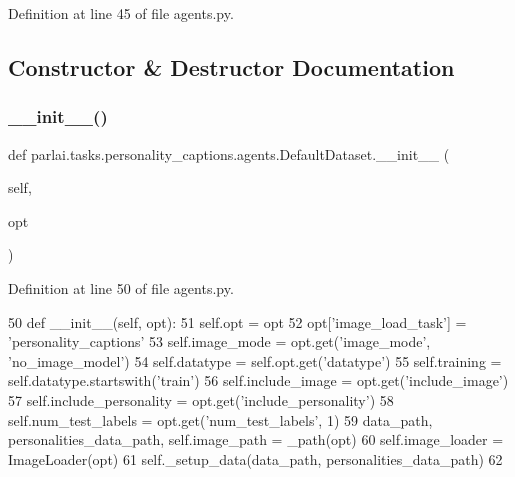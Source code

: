 Definition at line 45 of file agents.\+py.



\subsection{Constructor \& Destructor Documentation}
\mbox{\label{classparlai_1_1tasks_1_1personality__captions_1_1agents_1_1DefaultDataset_ad6cd645c8b905614663c2b6a0595fb68}} 
\subsubsection{\texorpdfstring{\+\_\+\+\_\+init\+\_\+\+\_\+()}{\_\_init\_\_()}}
{\footnotesize\ttfamily def parlai.\+tasks.\+personality\+\_\+captions.\+agents.\+Default\+Dataset.\+\_\+\+\_\+init\+\_\+\+\_\+ (\begin{DoxyParamCaption}\item[{}]{self,  }\item[{}]{opt }\end{DoxyParamCaption})}



Definition at line 50 of file agents.\+py.


\begin{DoxyCode}
50     \textcolor{keyword}{def }\_\_init\_\_(self, opt):
51         self.opt = opt
52         opt[\textcolor{stringliteral}{'image\_load\_task'}] = \textcolor{stringliteral}{'personality\_captions'}
53         self.image\_mode = opt.get(\textcolor{stringliteral}{'image\_mode'}, \textcolor{stringliteral}{'no\_image\_model'})
54         self.datatype = self.opt.get(\textcolor{stringliteral}{'datatype'})
55         self.training = self.datatype.startswith(\textcolor{stringliteral}{'train'})
56         self.include\_image = opt.get(\textcolor{stringliteral}{'include\_image'})
57         self.include\_personality = opt.get(\textcolor{stringliteral}{'include\_personality'})
58         self.num\_test\_labels = opt.get(\textcolor{stringliteral}{'num\_test\_labels'}, 1)
59         data\_path, personalities\_data\_path, self.image\_path = \_path(opt)
60         self.image\_loader = ImageLoader(opt)
61         self.\_setup\_data(data\_path, personalities\_data\_path)
62 
\end{DoxyCode}


